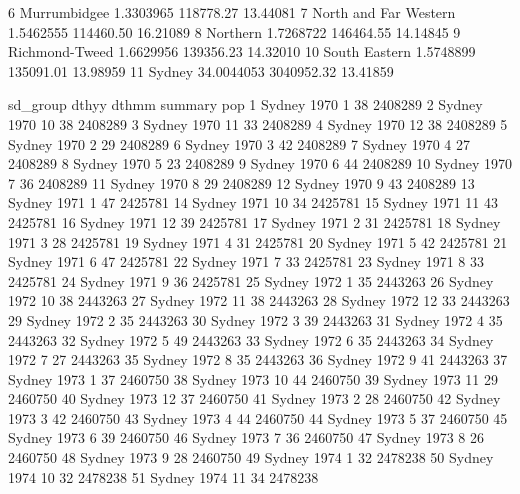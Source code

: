 \documentclass[a4paper]{article}                %
\begin{document}
\begin{Schunk}
\begin{Soutput}
6           Murrumbidgee        1.3303965  118778.27 13.44081
7  North and Far Western        1.5462555  114460.50 16.21089
8               Northern        1.7268722  146464.55 14.14845
9         Richmond-Tweed        1.6629956  139356.23 14.32010
10         South Eastern        1.5748899  135091.01 13.98959
11                Sydney       34.0044053 3040952.32 13.41859
\end{Soutput}
\begin{Soutput}
    sd_group dthyy dthmm summary     pop
1     Sydney  1970     1      38 2408289
2     Sydney  1970    10      38 2408289
3     Sydney  1970    11      33 2408289
4     Sydney  1970    12      38 2408289
5     Sydney  1970     2      29 2408289
6     Sydney  1970     3      42 2408289
7     Sydney  1970     4      27 2408289
8     Sydney  1970     5      23 2408289
9     Sydney  1970     6      44 2408289
10    Sydney  1970     7      36 2408289
11    Sydney  1970     8      29 2408289
12    Sydney  1970     9      43 2408289
13    Sydney  1971     1      47 2425781
14    Sydney  1971    10      34 2425781
15    Sydney  1971    11      43 2425781
16    Sydney  1971    12      39 2425781
17    Sydney  1971     2      31 2425781
18    Sydney  1971     3      28 2425781
19    Sydney  1971     4      31 2425781
20    Sydney  1971     5      42 2425781
21    Sydney  1971     6      47 2425781
22    Sydney  1971     7      33 2425781
23    Sydney  1971     8      33 2425781
24    Sydney  1971     9      36 2425781
25    Sydney  1972     1      35 2443263
26    Sydney  1972    10      38 2443263
27    Sydney  1972    11      38 2443263
28    Sydney  1972    12      33 2443263
29    Sydney  1972     2      35 2443263
30    Sydney  1972     3      39 2443263
31    Sydney  1972     4      35 2443263
32    Sydney  1972     5      49 2443263
33    Sydney  1972     6      35 2443263
34    Sydney  1972     7      27 2443263
35    Sydney  1972     8      35 2443263
36    Sydney  1972     9      41 2443263
37    Sydney  1973     1      37 2460750
38    Sydney  1973    10      44 2460750
39    Sydney  1973    11      29 2460750
40    Sydney  1973    12      37 2460750
41    Sydney  1973     2      28 2460750
42    Sydney  1973     3      42 2460750
43    Sydney  1973     4      44 2460750
44    Sydney  1973     5      37 2460750
45    Sydney  1973     6      39 2460750
46    Sydney  1973     7      36 2460750
47    Sydney  1973     8      26 2460750
48    Sydney  1973     9      28 2460750
49    Sydney  1974     1      32 2478238
50    Sydney  1974    10      32 2478238
51    Sydney  1974    11      34 2478238

\end{Soutput}
\end{Schunk}
\end{document}
